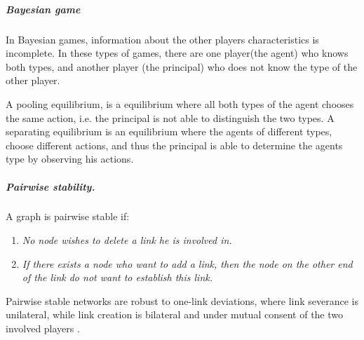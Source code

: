 \subparagraph{Bayesian game}
In Bayesian games, information about the other players characteristics is incomplete. In these types of games, there are one player(the agent) who knows both types, and another player (the principal) who does not know the type of the other player. 

A pooling equilibrium, is a equilibrium where all both types of the agent chooses the same action, i.e. the principal is not able to distinguish the two types. 
A separating equilibrium is an equilibrium where the agents of different types, choose different actions, and thus the principal is able to determine the agents type by observing his actions.
\subparagraph{Pairwise stability.}
A graph is pairwise stable if:
 \begin{enumerate}
\item \textit{No node wishes to delete a link he is involved in.}
\item \textit{If there exists a node who want to add a link, then the node on the other end of the link do not want to establish this link.}
\end{enumerate} 
Pairwise stable networks are robust to one-link deviations, where link
severance is unilateral, while link creation is bilateral and under mutual consent of the two involved
players \cite{calvo2009pairwise}.

